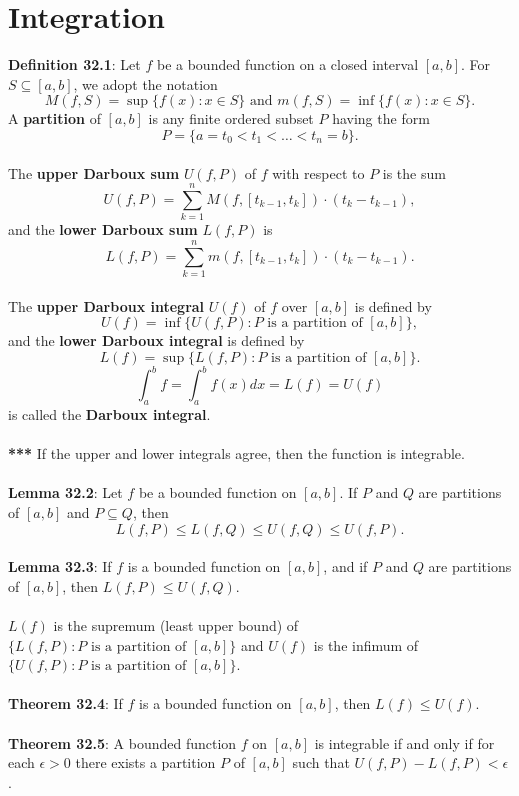 \documentclass{article}
\theoremstyle{definition}
\DeclareMathOperator{\Inf}{inf}
\DeclareMathOperator{\Sup}{sup}
\begin{document}
\section*{Integration}
\textbf{Definition 32.1}: Let $f$ be a bounded function on a closed interval $[a, b]$. For $S \subseteq [a, b]$, we adopt the notation $$M(f,S) = \Sup\{f(x) : x \in S\} \text{ and } m(f,S) = \Inf\{f(x) : x \in S\}.$$
A \textbf{partition} of $[a, b]$ is any finite ordered subset $P$ having the form $$P = \{a = t_0 < t_1 < \dots < t_n = b\}.$$ \\
The \textbf{upper Darboux sum} $U(f,P)$ of $f$ with respect to $P$ is the sum $$U(f,P) = \sum^n_{k = 1} M(f, [t_{k - 1}, t_k]) \cdot (t_k - t_{k - 1}),$$ and the \textbf{lower Darboux sum} $L(f,P)$ is $$L(f,P) = \sum^n_{k = 1} m(f, [t_{k - 1}, t_k]) \cdot (t_k - t_{k - 1}).$$ \\
The \textbf{upper Darboux integral} $U(f)$ of $f$ over $[a, b]$ is defined by $$U(f) = \Inf\{U(f, P) : P \text{ is a partition of } [a, b]\},$$ and the \textbf{lower Darboux integral} is defined by $$L(f) = \Sup\{L(f, P) : P \text{ is a partition of } [a, b]\}.$$
$$\int_a^b f = \int_a^b f(x)dx = L(f) = U(f)$$ is called the \textbf{Darboux integral}. \\ \\
\textbf{***} If the upper and lower integrals agree, then the function is integrable. \\ \\
\textbf{Lemma 32.2}: Let $f$ be a bounded function on $[a, b]$. If $P$ and $Q$ are partitions of $[a, b]$ and $P \subseteq Q$, then
$$L(f,P) \leq L(f,Q) \leq U(f,Q) \leq U(f,P).$$ \\
\textbf{Lemma 32.3}: If $f$ is a bounded function on $[a, b]$, and if $P$ and $Q$ are partitions of $[a, b]$, then $L(f,P) \leq U(f,Q).$ \\ \\
$L(f)$ is the supremum (least upper bound) of $\{L(f, P) : P \text{ is a partition of } [a, b]\}$ and $U(f)$ is the infimum of $\{U(f, P) : P \text{ is a partition of } [a, b]\}$. \\ \\
\textbf{Theorem 32.4}: If $f$ is a bounded function on $[a, b]$, then $L(f) \leq U(f)$. \\ \\
\textbf{Theorem 32.5}: A bounded function $f$ on $[a, b]$ is integrable if and only if for each $\epsilon > 0$ there exists a partition $P$ of $[a, b]$ such that $U(f,P) - L(f,P) < \epsilon$. \\ \\
\end{document}
